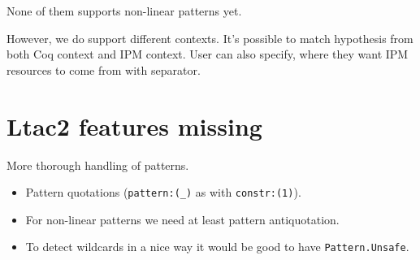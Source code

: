 None of them supports non-linear patterns yet.

However, we do support different contexts.
It's possible to match hypothesis from both Coq context and IPM context.
User can also specify, where they want IPM resources to come from with separator.


\section{Ltac2 features missing}

More thorough handling of patterns.
\begin{itemize}
\item Pattern quotations (\verb|pattern:(_)| as with \verb|constr:(1)|).
\item For non-linear patterns we need at least pattern antiquotation.
\item To detect wildcards in a nice way it would be good to have \verb|Pattern.Unsafe|.
\end{itemize}

